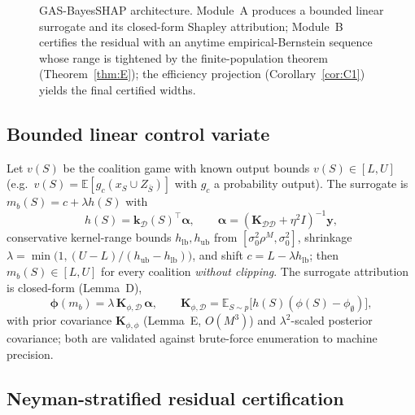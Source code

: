 \documentclass[preprint,12pt]{elsarticle}
\newcommand{\E}{\mathbb{E}}
\begin{document}
\begin{figure}[htbp]
{}
\caption{GAS-BayesSHAP architecture. Module~A produces a bounded linear surrogate and its closed-form Shapley attribution; Module~B certifies the residual with an anytime empirical-Bernstein sequence whose range is tightened by the finite-population theorem (Theorem~\ref{thm:E}); the efficiency projection (Corollary~\ref{cor:C1}) yields the final certified widths.}
\label{fig:arch}
\end{figure}

\subsection{Bounded linear control variate}\label{sec:bcv}

Let $v(S)$ be the coalition game with known output bounds $v(S)\in[L,U]$ (e.g.\ $v(S)=\E[g_c(x_S\cup Z_{\bar S})]$ with $g_c$ a probability output). The surrogate is $m_b(S)=c+\lambda h(S)$ with
\begin{equation}
h(S)=\mathbf{k}_{\mathcal{D}}(S)^\top\boldsymbol{\alpha},\qquad
\boldsymbol{\alpha}=(\mathbf{K}_{\mathcal{D}\mathcal{D}}+\eta^2 I)^{-1}\mathbf{y},
\label{eq:surrogate}
\end{equation}
conservative kernel-range bounds $h_{\mathrm{lb}},h_{\mathrm{ub}}$ from $[\sigma_0^2\rho^M,\sigma_0^2]$, shrinkage $\lambda=\min\!\big(1,(U-L)/(h_{\mathrm{ub}}-h_{\mathrm{lb}})\big)$, and shift $c=L-\lambda h_{\mathrm{lb}}$; then $m_b(S)\in[L,U]$ for every coalition \emph{without clipping}. The surrogate attribution is closed-form (Lemma~D),
\begin{equation}
\boldsymbol{\phi}(m_b)=\lambda\,\mathbf{K}_{\phi,\mathcal{D}}\,\boldsymbol{\alpha},\qquad
\mathbf{K}_{\phi,\mathcal{D}}=\E_{S\sim p}\big[h(S)(\phi(S)-\phi_{\emptyset})\big],
\label{eq:lemD}
\end{equation}
with prior covariance $\mathbf{K}_{\phi,\phi}$ (Lemma~E, $O(M^3)$) and $\lambda^2$-scaled posterior covariance; both are validated against brute-force enumeration to machine precision.

\subsection{Neyman-stratified residual certification}\label{sec:cert}
\end{document}
